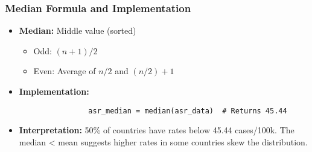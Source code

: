 \begin{frame}[fragile]
    \frametitle{Median Formula and Implementation}
    \begin{itemize}
        \item \textbf{Median:} Middle value (sorted)
              \begin{itemize}
                  \item Odd: $(n+1)/2$
                  \item Even: Average of $n/2$ and $(n/2)+1$
              \end{itemize}

        \item \textbf{Implementation:}
              \begin{lstlisting}
                asr_median = median(asr_data)  # Returns 45.44
            \end{lstlisting}

        \item \textbf{Interpretation:} 50\% of countries have rates below 45.44 cases/100k. The median < mean suggests higher rates in some countries skew the distribution.
    \end{itemize}
\end{frame}

